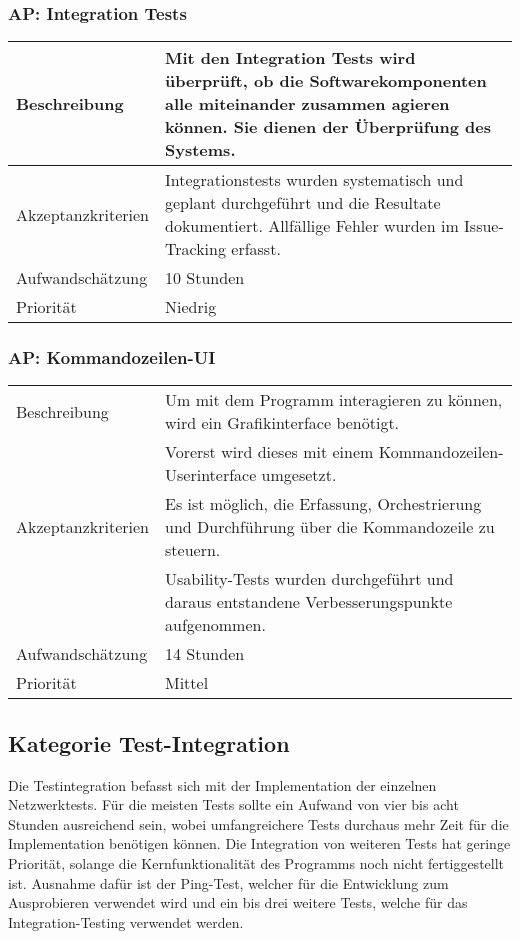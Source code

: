 \documentclass[
	ngerman,
	toc=listof, %
	toc=bibliography, %
	footnotes=multiple, %
	parskip=half, %
	numbers=noendperiod %
]{scrartcl}
\begin{document}
	\subsubsection{AP: Integration Tests}
	\begin{tabularx}{\textwidth}{lX}
		\toprule
		Beschreibung & Mit den Integration Tests wird überprüft, ob die Softwarekomponenten alle miteinander zusammen agieren können. Sie dienen der Überprüfung des Systems.\\
		\midrule
		Akzeptanzkriterien & Integrationstests wurden systematisch und geplant durchgeführt und die Resultate dokumentiert. Allfällige Fehler wurden im Issue-Tracking erfasst.\\
		\midrule
		Aufwandschätzung & 10 Stunden\\
		\midrule
		Priorität & Niedrig\\
		\bottomrule
	\end{tabularx}
	
	\subsubsection{AP: Kommandozeilen-UI}
	\begin{tabularx}{\textwidth}{lX}
		\toprule
		Beschreibung & Um mit dem Programm interagieren zu können, wird ein Grafikinterface benötigt.\\
		 & Vorerst wird dieses mit einem Kommandozeilen-Userinterface umgesetzt.\\
		\midrule
		Akzeptanzkriterien & Es ist möglich, die Erfassung, Orchestrierung und Durchführung über die Kommandozeile zu steuern.\\
		 & Usability-Tests wurden durchgeführt und daraus entstandene Verbesserungspunkte aufgenommen.\\
		\midrule
		Aufwandschätzung & 14 Stunden\\
		\midrule
		Priorität & Mittel \\
		\bottomrule
	\end{tabularx}
	\newpage

	

	\subsection{Kategorie Test-Integration}
	Die Testintegration befasst sich mit der Implementation der einzelnen Netzwerktests. 
	Für die meisten Tests sollte ein Aufwand von vier bis acht Stunden ausreichend sein, wobei umfangreichere Tests durchaus mehr Zeit für die Implementation benötigen können.
	Die Integration von weiteren Tests hat geringe Priorität, solange die Kernfunktionalität des Programms noch nicht fertiggestellt ist. 
	Ausnahme dafür ist der Ping-Test, welcher für die Entwicklung zum Ausprobieren verwendet wird und ein bis drei weitere Tests, welche für das Integration-Testing verwendet werden.
\end{document}
